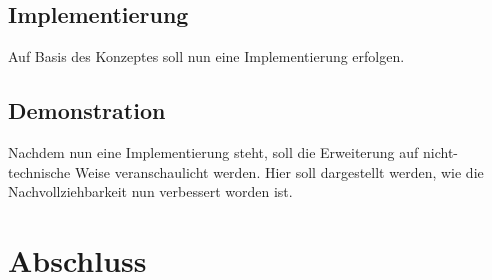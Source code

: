 \documentclass[oneside, ngerman, final, 11pt, a4paper, 1.1headlines, headinclude=false, footinclude=false, mpinclude=false, pagesize, onecolumn, titlepage, parskip=half, headsepline, chapterprefix=false, version=first, listof=totoc, bibliography=totoc, toc=graduated, fleqn, twoside=true]{scrbook}
\begin{document}
		\section{Implementierung}
		
		Auf Basis des Konzeptes soll nun eine Implementierung erfolgen.
	
		\section{Demonstration}
		
		Nachdem nun eine Implementierung steht, soll die Erweiterung auf nicht-technische Weise veranschaulicht werden. Hier soll dargestellt werden, wie die Nachvollziehbarkeit nun verbessert worden ist.
	
	\chapter{Abschluss}
	
	
%	
	
	
	\settowidth{\nomlabelwidth}{API}
	\printnomenclature{}
	
	\newpage{}
	
	
	\listoffigures
	
	\newpage{}
	
	
	\listoftables
	
	\lstlistoflistings
	
	\newpage{}
	
	
	
\end{document}
